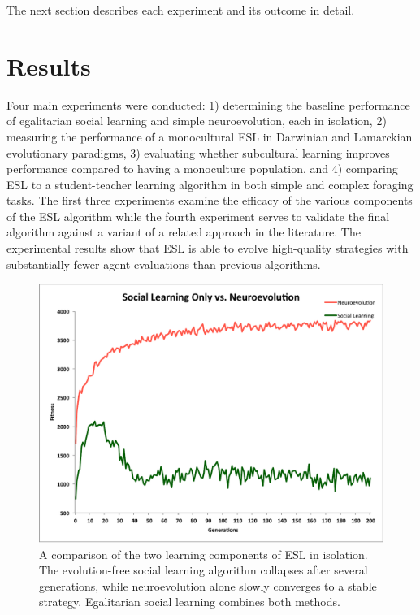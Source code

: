 \documentclass{sig-alternate}
\begin{document}
The next section describes each experiment and its outcome in detail.


\section{Results}
\label{sec:results}
Four main experiments were conducted: 1) determining the baseline performance of egalitarian social learning and simple neuroevolution, each in isolation, 2) measuring the performance of a monocultural ESL in Darwinian and Lamarckian evolutionary paradigms, 3) evaluating whether subcultural learning improves performance compared to having a monoculture population, and 4) comparing ESL to a student-teacher learning algorithm in both simple and complex foraging tasks. The first three experiments examine the efficacy of the various components of the ESL algorithm while the fourth experiment serves to validate the final algorithm against a variant of a related approach in the literature. The experimental results show that ESL is able to evolve high-quality strategies with substantially fewer agent evaluations than previous algorithms.


\begin{figure}
  \centering
    \includegraphics[scale=.41]{social_learning_vs_neuroevolution.pdf}
  \caption{A comparison of the two learning components of ESL in isolation.  The evolution-free social learning algorithm collapses after several generations, while neuroevolution alone slowly converges to a stable strategy.  Egalitarian social learning combines both methods.}
  \label{fig:social-neuro}
\end{figure}
\end{document}
